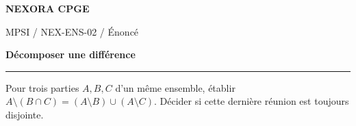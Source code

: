 \documentclass[11pt,a4paper]{article}
\begin{document}
{\small\bfseries\color{nexorablue} NEXORA CPGE}\par
{\small MPSI / NEX-ENS-02 / Énoncé}\par
{\LARGE\bfseries Décomposer une différence}\par
\vspace{0.25em}\hrule\vspace{0.6em}

Pour trois parties $A,B,C$ d’un même ensemble, établir $A\setminus(B\cap C)=(A\setminus B)\cup(A\setminus C)$. Décider si cette dernière réunion est toujours disjointe.
\end{document}
